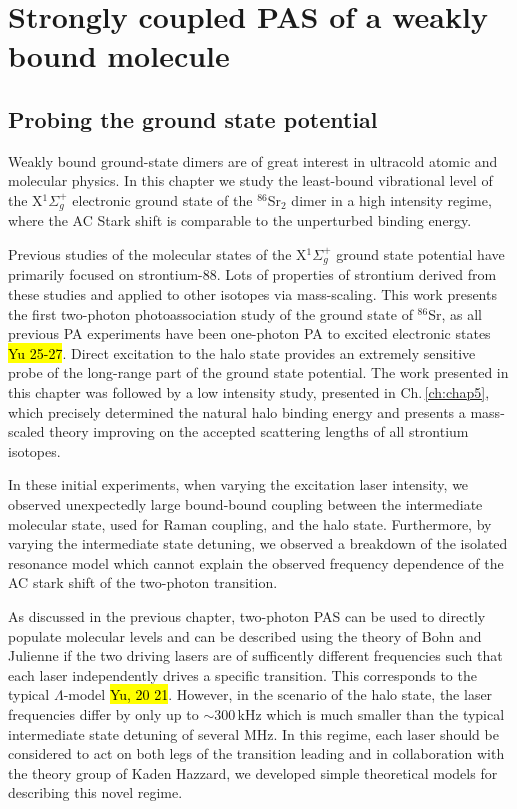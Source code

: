 \chapter{Strongly coupled PAS of a weakly bound molecule} \label{ch:chap4}
\section{Probing the ground state potential} \label{sec:highE_intro}
Weakly bound ground-state dimers are of great interest in ultracold atomic and molecular physics. 
In this chapter we study the least-bound vibrational level of the X$^1\Sigma_g^+$ electronic ground state of the $^{86}$Sr$_2$ dimer in a high intensity regime, where the AC Stark shift is comparable to the unperturbed binding energy.

Previous studies of the molecular states of the X$^1\Sigma_g^+$ ground state potential have primarily focused on strontium-88.
Lots of properties of strontium derived from these studies and applied to other isotopes via mass-scaling.
This work presents the first two-photon photoassociation study of the ground state of $^{86}$Sr, as all previous PA experiments have been one-photon PA to excited electronic states \hl{Yu 25-27}.
Direct excitation to the halo state provides an extremely sensitive probe of the long-range part of the ground state potential.
The work presented in this chapter was followed by a low intensity study, presented in Ch.\,\ref{ch:chap5}, which precisely determined the natural halo binding energy and presents a mass-scaled theory improving on the accepted scattering lengths of all strontium isotopes.

In these initial experiments, when varying the excitation laser intensity, we observed unexpectedly large bound-bound coupling between the intermediate molecular state, used for Raman coupling, and the halo state.
Furthermore, by varying the intermediate state detuning, we observed a breakdown of the isolated resonance model which cannot explain the observed frequency dependence of the AC stark shift of the two-photon transition.

As discussed in the previous chapter, two-photon PAS can be used to directly populate molecular levels and can be described using the theory of Bohn and Julienne if the two driving lasers are of sufficently different frequencies such that each laser independently drives a specific transition.
This corresponds to the typical $\Lambda$-model \hl{Yu, 20 21}.
However, in the scenario of the halo state, the laser frequencies differ by only up to $\sim$300\,kHz which is much smaller than the typical intermediate state detuning of several MHz.
In this regime, each laser should be considered to act on both legs of the transition leading and in collaboration with the theory group of Kaden Hazzard, we developed simple theoretical models for describing this novel regime.

